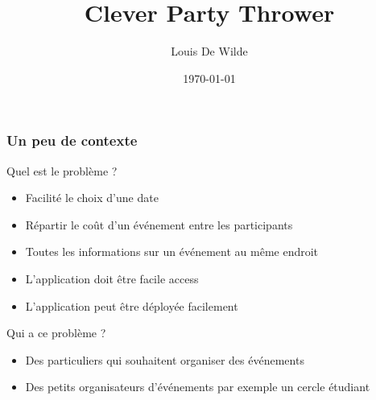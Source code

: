 \documentclass[aspectratio=169]{beamer}
\title{Clever Party Thrower}
\author{Louis De Wilde}
\date{\today}
\begin{document}
    \frame{\titlepage}
    \begin{frame}
        \frametitle{Un peu de contexte}
        Quel est le problème ?
        \begin{itemize}
            \item Facilité le choix d'une date
            \item Répartir le coût d'un événement entre les participants
            \item Toutes les informations sur un événement au même endroit
            \item L'application doit être facile access
            \item L'application peut être déployée facilement
        \end{itemize}
        Qui a ce problème ?
        \begin{itemize}
            \item Des particuliers qui souhaitent organiser des événements
            \item Des petits organisateurs d'événements par exemple un cercle étudiant
        \end{itemize}
    \end{frame}
\end{document}
